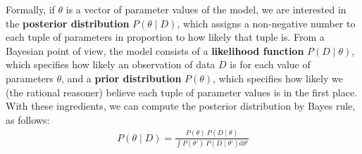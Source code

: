 \documentclass[nobib]{tufte-handout}
\begin{document}
Formally, if $\theta$ is a vector of parameter values of the model, we are interested in the \textbf{posterior distribution} $P(\theta \mid D)$, which assigns a non-negative number to each tuple of parameters in proportion to how likely that tuple is.
From a Bayesian point of view, the model consists of a \textbf{likelihood function} $P(D \mid \theta)$, which specifies how likely an observation of data $D$ is for each value of parameters $\theta$, and a \textbf{prior distribution} $P(\theta)$, which specifies how likely we (the rational reasoner) believe each tuple of parameter values is in the first place.
%
%
With these ingredients, we can compute the posterior distribution by Bayes rule, as follows:
\begin{eqnarray*}
  P(\theta \mid D) = \frac{P(\theta) \ P(D \mid \theta)}{ \int P(\theta') \ P(D \mid
  \theta') \textrm{d}\theta'}
\end{eqnarray*}

\end{document}
